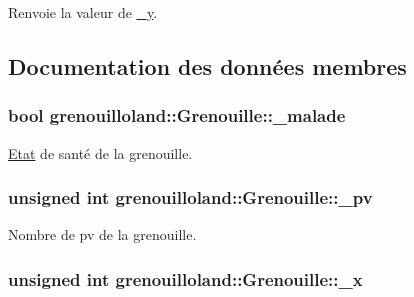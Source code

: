 \begin{DoxyReturn}{Renvoie}
la valeur de \hyperlink{classgrenouilloland_1_1Grenouille_accbac66bf92efeca1135682eb24c99e7}{\-\_\-y}. 
\end{DoxyReturn}


\subsection{Documentation des données membres}
\hypertarget{classgrenouilloland_1_1Grenouille_a0fbd566d479f7c5b2968606948869b42}{
\subsubsection[{\-\_\-malade}]{\setlength{\rightskip}{0pt plus 5cm}bool grenouilloland\-::\-Grenouille\-::\-\_\-malade\hspace{0.3cm}{\ttfamily [protected]}}}\label{classgrenouilloland_1_1Grenouille_a0fbd566d479f7c5b2968606948869b42}
\hyperlink{classgrenouilloland_1_1Etat}{Etat} de santé de la grenouille. \hypertarget{classgrenouilloland_1_1Grenouille_a8dc2111b41b87f2c751405841dd73604}{
\subsubsection[{\-\_\-pv}]{\setlength{\rightskip}{0pt plus 5cm}unsigned int grenouilloland\-::\-Grenouille\-::\-\_\-pv\hspace{0.3cm}{\ttfamily [protected]}}}\label{classgrenouilloland_1_1Grenouille_a8dc2111b41b87f2c751405841dd73604}
Nombre de pv de la grenouille. \hypertarget{classgrenouilloland_1_1Grenouille_ac058265e4d19df895f88d2c485a62eee}{
\subsubsection[{\-\_\-x}]{\setlength{\rightskip}{0pt plus 5cm}unsigned int grenouilloland\-::\-Grenouille\-::\-\_\-x\hspace{0.3cm}{\ttfamily [protected]}}}\label{classgrenouilloland_1_1Grenouille_ac058265e4d19df895f88d2c485a62eee}
